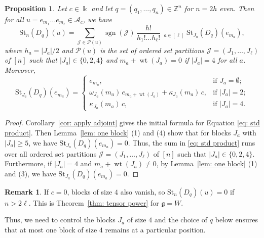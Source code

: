\documentclass[12pt]{amsart}
\theoremstyle{plain}
\newtheorem{proposition}[theorem]{Proposition}
\theoremstyle{definition}
\newtheorem{remark}[theorem]{Remark}
\numberwithin{equation}{theorem}
\newcommand{\kk}{\Bbbk}
\newcommand{\sgn}{\operatorname{sgn}}
\newcommand{\ZZ}{\mathbb{Z}}
\newcommand{\mc}[1]{\mathcal{#1}}
\newcommand{\calA}{\mathcal A}
\newcommand{\g}{\mathfrak{g}}
\newcommand{\St}{\mathrm{St}}
\newcommand{\length}[1]{\left\lvert #1\right\rvert}
\newcommand{\wt}{\operatorname{wt}}
\DeclareMathOperator*{\iprod}{\overset{\rightarrow}{\prod}}
\begin{document}
\begin{proposition}\label{prop: monomial applied}
    Let $c \in \kk$ and let $q = (q_1, \dots, q_n) \in \ZZ^n$ for $n = 2h$ even. Then for all $u = e_{m_1} \dots e_{m_\ell} \in \calA_c$, we have 
    \begin{equation}\label{eq: std product}
        \St_n(D_q)(u) = \sum_{\mc{J} \in \mc{P}(u)} \sgn(\mc{J})\,
      \frac{h!}{h_1! \dots h_\ell!} \, \iprod_{a \in [\ell]} \St_{J_a}(D_q)(e_{m_a}),
    \end{equation}
    where $h_a = \length{J_a}/2$ and $\mc{P}(u)$ is the set of ordered set partitions $\mc{J} = (J_1, \dots, J_\ell)$ of $[n]$ such that $\length{J_a} \in \{0, 2, 4\}$ and $m_a + \wt(J_a) = 0$ if $\length{J_a} = 4$ for all $a$. Moreover, 
  \[
    \St_{J_a}(D_q)(e_{m_a}) =
    \begin{cases}
      e_{m_a}, & \text{if } J_a = \emptyset; \\
      \omega_{J_a}(m_a)\, e_{m_a + \wt(J_a)} +  \kappa_{J_a}(m_a)\, c,
        & \text{if } \length{J_a} = 2; \\
      \kappa_{J_a}(m_a)\, c, & \text{if } \length{J_a} = 4.
    \end{cases}
  \]
\end{proposition}
\begin{proof}
    Corollary~\ref{cor: apply adjoint} gives the initial formula for Equation \eqref{eq: std product}. Then Lemma~\ref{lem: one block} (1) and (4) show that for blocks $J_a$ with $\length{J_a} \ge 5$, we have $\St_{J_a}(D_q)(e_{m_a}) = 0$. Thus, the sum in \eqref{eq: std product} runs over all ordered set partitions $\mathcal J = (J_1, \dots, J_\ell)$ of $[n]$ such that $\length{J_a} \in \{0, 2, 4\}$. Furthermore, if $\length{J_a} =4$ and $m_a + \wt(J_a) \neq 0$, by Lemma~\ref{lem: one block} (1) and (3), we have $\St_{J_a}(D_q)(e_{m_a}) = 0$.  
\end{proof}

\begin{remark}\label{remark: bound 1}
    If $c=0$, blocks of size $4$ also vanish, so $\St_n(D_q)(u) = 0$ if $n > 2\ell$. This is Theorem~\ref{thm: tensor power} for $\g = W$. 
\end{remark}

Thus, we need to control the blocks $J_a$ of size $4$ and the choice of $q$ below ensures that at most one block of size $4$ remains at a particular position.
\end{document}
